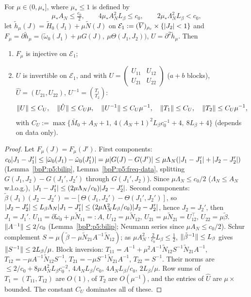 \begin{lemma}\label{bpP:p5:freq-inj}
For $\mu\in(0,\mu_*]$, where $\mu_*\le1$ is defined by
\[\mu_*A_N\le\tfrac{c_0}2,\qquad 4\mu_*A_N^2L_\beta\le c_0,\qquad2\mu_*\Lambda_N^2L_\beta<c_0,\]
let $\tilde h_\mu(J)=\tilde H_0(J_1)+\mu\tilde N(J)$ on $\mathcal E_1:=(\overline V)_{\rho_c}\times\{\lvert J_2\rvert<1\}$ and $F_\mu=\partial\tilde h_\mu=\bigl(\tilde\omega_0(J_1)+\mu G(J),\ \mu\Theta(J_1,J_2)\bigr)$, $U=\partial^2\tilde h_\mu$. Then
\begin{enumerate}[label=(\alph*)]
\item $F_\mu$ is injective on $\mathcal E_1$;
\item $U$ is invertible on $\mathcal E_1$, and with $U=\begin{pmatrix}U_{11}&U_{12}\\U_{21}&U_{22}\end{pmatrix}$ ($a+b$ blocks), $\hat U=(U_{21},U_{22})$, $U^{-1}=\binom{T_1}{T_2}$:
\[\lVert U\rVert\le C_U,\quad\lVert \hat U\rVert\le C_U\mu,\quad\lVert U^{-1}\rVert\le C_U\mu^{-1},\quad\lVert T_1\rVert\le C_U,\quad\lVert T_2\rVert\le C_U\mu^{-1},\]
with $C_U:=\max\{\bar M_0+A_N+1,\ 4(A_N+1)^2L_\beta c_0^{-1}+4,\ 8L_\beta+4\}$ (depends on data only).
\end{enumerate}
\end{lemma}
\begin{proof}
\label{stepP:p5:fi-inj} Let $F_\mu(J)=F_\mu(J')$. First components: $c_0\lvert J_1-J_1'\rvert\le\lvert \tilde\omega_0(J_1)-\tilde\omega_0(J_1')\rvert=\mu\lvert G(J)-G(J')\rvert\le\mu\Lambda_N(\lvert J_1-J_1'\rvert+\lvert J_2-J_2'\rvert)$ (Lemma~\ref{bpP:p5:bilip}, Lemma~\ref{bpP:p5:freq-data}, splitting $G(J_1,J_2)-G(J_1',J_2')$ through $G(J_1',J_2)$). Since $\mu\Lambda_N\le c_0/2$ ($\Lambda_N\le A_N$ w.l.o.g.), $\lvert J_1-J_1'\rvert\le(2\mu\Lambda_N/c_0)\lvert J_2-J_2'\rvert$. Second components: $\tilde\beta(J_1)(J_2-J_2')=-[\Theta(J_1,J_2')-\Theta(J_1',J_2')]$, so $\lvert J_2-J_2'\rvert\le L_\beta\Lambda_N\lvert J_1-J_1'\rvert\le(2\mu\Lambda_N^2L_\beta/c_0)\lvert J_2-J_2'\rvert$, hence $J_2=J_2'$, then $J_1=J_1'$.
\label{stepP:p5:fi-blk} $U_{11}=\partial\tilde\omega_0+\mu\tilde N_{11}=:A$, $U_{12}=\mu\tilde N_{12}$, $U_{21}=\mu\tilde N_{21}=U_{12}^\top$, $U_{22}=\mu\tilde\beta$. $\lVert A^{-1}\rVert\le2/c_0$ (Lemma~\ref{bpP:p5:bilip}; Neumann series since $\mu A_N\le c_0/2$). Schur complement $S=\mu(\tilde\beta-\mu\tilde N_{21}A^{-1}\tilde N_{12})$; as $\mu A_N^2\cdot\frac2{c_0}L_\beta\le\frac12$, $\lVert \tilde\beta^{-1}\rVert\le L_\beta$ gives $\lVert S^{-1}\rVert\le2L_\beta/\mu$.
\label{stepP:p5:fi-inv} Block inversion: $T_{11}=A^{-1}+\mu^2A^{-1}\tilde N_{12}S^{-1}\tilde N_{21}A^{-1}$, $T_{12}=-\mu A^{-1}\tilde N_{12}S^{-1}$, $T_{21}=-\mu S^{-1}\tilde N_{21}A^{-1}$, $T_{22}=S^{-1}$. Their norms are $\le2/c_0+8\mu A_N^2L_\beta c_0^{-2}$, $4A_NL_\beta/c_0$, $4A_NL_\beta/c_0$, $2L_\beta/\mu$. Row sums of $T_1=(T_{11},T_{12})$ are $O(1)$, of $T_2$ are $O(\mu^{-1})$, and the entries of $\hat U$ are $\mu\times$ bounded. The constant $C_U$ dominates all of these.
\end{proof}
